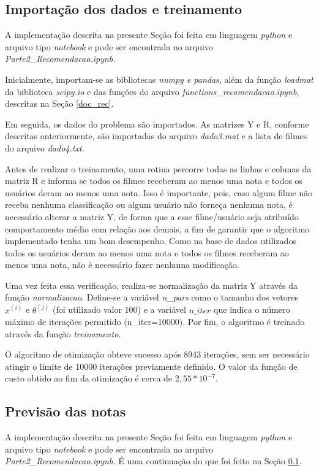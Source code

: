\documentclass[12pt]{article}
\begin{document}
\subsection{Importação dos dados e treinamento} \label{treino_rec}
A implementação descrita na presente Seção foi feita em linguagem \textit{python} e arquivo tipo \textit{notebook} e pode ser encontrada no arquivo \textit{Parte2\_Recomendacao.ipynb.}

Inicialmente, importam-se as bibliotecas \textit{numpy e pandas}, além da função \textit{loadmat} da biblioteca \textit{scipy.io} e das funções do arquivo \textit{functions\_recomendacao.ipynb}, descritas na Seção \ref{doc_rec}.

Em seguida, os dados do problema são importados. As matrizes Y e R, conforme descritas anteriormente, são importadas do arquivo \textit{dado3.mat} e a lista de filmes do arquivo \textit{dado4.txt.}

Antes de realizar o treinamento, uma rotina percorre todas as linhas e colunas da matriz R e informa se todos os filmes receberam ao menos uma nota e todos os usuários deram ao menos uma nota. Isso é importante, pois, caso algum filme não receba nenhuma classificação ou algum usuário não forneça nenhuma nota, é necessário alterar a matriz Y, de forma que a esse filme/usuário seja atribuído comportamento médio com relação aos demais, a fim de garantir que o algoritmo implementado tenha um bom desempenho. Como na base de dados utilizados todos os usuários deram ao menos uma nota e todos os filmes receberam ao menos uma nota, não é necessário fazer nenhuma modificação.

Uma vez feita essa verificação, realiza-se normalização da matriz Y através da função \textit{normalizacao}. Define-se a variável \textit{n\_pars} como o tamanho dos vetores $x^{(i)}$ e $\theta^{(j)}$ (foi utilizado valor 100) e a variável $n\_iter$ que indica o número máximo de iterações permitido (n\_iter=10000). Por fim, o algoritmo é treinado através da função \textit{treinamento.}

O algoritmo de otimização obteve sucesso após 8943 iterações, sem ser necessário atingir o limite de 10000 iterações previamente definido. O valor da função de custo obtido ao fim da otimização é cerca de $2,55 * 10^{-7}$.

\subsection{Previsão das notas} \label{notas_rec}
A implementação descrita na presente Seção foi feita em linguagem \textit{python} e arquivo tipo \textit{notebook} e pode ser encontrada no arquivo \textit{Parte2\_Recomendacao.ipynb.} É uma continuação do que foi feito na Seção \ref{treino_rec}.
\end{document}
